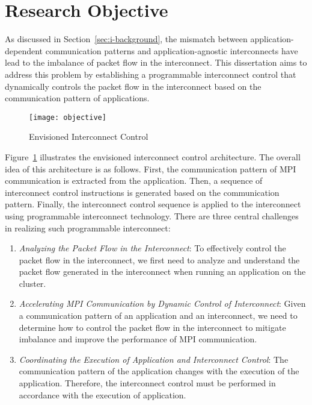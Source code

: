 \section{Research Objective}

As discussed in Section~\ref{sec:i-background}, the mismatch between
application-dependent communication patterns and application-agnostic
interconnects have lead to the imbalance of packet flow in the interconnect.
This dissertation aims to address this problem by establishing a programmable
interconnect control that dynamically controls the packet flow in the
interconnect based on the communication pattern of applications.

\begin{figure}
    \centering
    \texttt{[image: objective]}
    \caption{Envisioned Interconnect Control}%
    \label{fig:objective}
\end{figure}

Figure~\ref{fig:objective} illustrates the envisioned interconnect control
architecture. The overall idea of this architecture is as follows. First, the
communication pattern of MPI communication is extracted from the application.
Then, a sequence of interconnect control instructions is generated based on
the communication pattern. Finally, the interconnect control sequence is
applied to the interconnect using programmable interconnect technology.
There are three central challenges in realizing such programmable interconnect:

\begin{enumerate}
\item \emph{Analyzing the Packet Flow in the Interconnect}:
    To effectively control the packet flow in the interconnect, we first need
    to analyze and understand the packet flow generated in the interconnect
    when running an application on the cluster.
\item \emph{Accelerating MPI Communication by Dynamic Control of Interconnect}:
    Given a communication pattern of an application and an interconnect,
    we need to determine how to control the packet flow in the interconnect to
    mitigate imbalance and improve the performance of MPI communication.
\item \emph{Coordinating the Execution of Application and Interconnect Control}:
    The communication pattern of the application changes with the execution of
    the application. Therefore, the interconnect control must be performed in
    accordance with the execution of application.
\end{enumerate}

